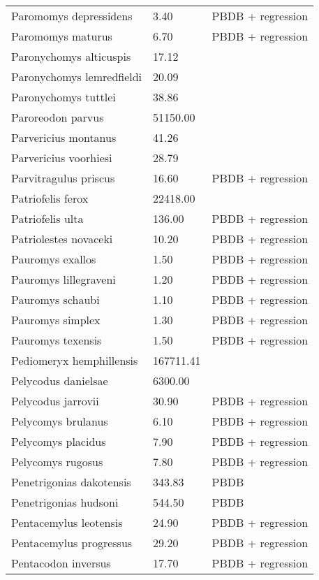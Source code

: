 \begin{longtable}{p{} p{} p{}}
    Paromomys depressidens & 3.40 & PBDB + regression \\ 
    Paromomys maturus & 6.70 & PBDB + regression \\ 
    Paronychomys alticuspis & 17.12 & \cite{Tomiya2013} \\ 
    Paronychomys lemredfieldi & 20.09 & \cite{Tomiya2013} \\ 
    Paronychomys tuttlei & 38.86 & \cite{Tomiya2013} \\ 
    Paroreodon parvus & 51150.00 & \cite{McKenna2011} \\ 
    Parvericius montanus & 41.26 & \cite{Tomiya2013} \\ 
    Parvericius voorhiesi & 28.79 & \cite{Tomiya2013} \\ 
    Parvitragulus priscus & 16.60 & PBDB + regression \\ 
    Patriofelis ferox & 22418.00 & \cite{McKenna2011} \\ 
    Patriofelis ulta & 136.00 & PBDB + regression \\ 
    Patriolestes novaceki & 10.20 & PBDB + regression \\ 
    Pauromys exallos & 1.50 & PBDB + regression \\ 
    Pauromys lillegraveni & 1.20 & PBDB + regression \\ 
    Pauromys schaubi & 1.10 & PBDB + regression \\ 
    Pauromys simplex & 1.30 & PBDB + regression \\ 
    Pauromys texensis & 1.50 & PBDB + regression \\ 
    Pediomeryx hemphillensis & 167711.41 & \cite{Tomiya2013} \\ 
    Pelycodus danielsae & 6300.00 & \cite{Soligo2006} \\ 
    Pelycodus jarrovii & 30.90 & PBDB + regression \\ 
    Pelycomys brulanus & 6.10 & PBDB + regression \\ 
    Pelycomys placidus & 7.90 & PBDB + regression \\ 
    Pelycomys rugosus & 7.80 & PBDB + regression \\ 
    Penetrigonias dakotensis & 343.83 & PBDB \\ 
    Penetrigonias hudsoni & 544.50 & PBDB \\ 
    Pentacemylus leotensis & 24.90 & PBDB + regression \\ 
    Pentacemylus progressus & 29.20 & PBDB + regression \\ 
    Pentacodon inversus & 17.70 & PBDB + regression \\ 

\end{longtable}
